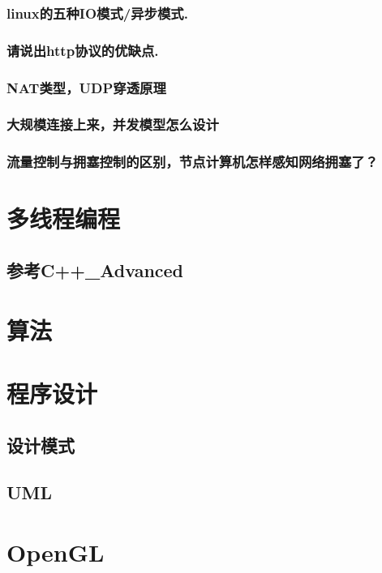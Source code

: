 \documentclass[UTF8,a4paper,8pt]{ctexart}
\begin{document}
		\subsubsection{linux的五种IO模式/异步模式.}
		
		\subsubsection{请说出http协议的优缺点.}
		
		\subsubsection{NAT类型，UDP穿透原理}
		
		\subsubsection{大规模连接上来，并发模型怎么设计}
		
		\subsubsection{流量控制与拥塞控制的区别，节点计算机怎样感知网络拥塞了？}
		
		

\newpage
\section{多线程编程}
	\subsection{参考C++\_Advanced}

\newpage
\section{算法}


\newpage
\section{程序设计}
	\subsection{设计模式}
	\subsection{UML}

\newpage
\section{OpenGL}
\end{document}
